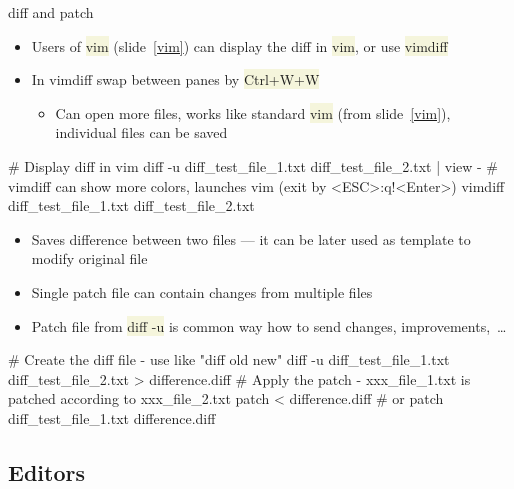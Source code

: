 \documentclass[compress, xelatex, 11pt, xcolor=svgnames, aspectratio=169,
	hyperref={
		bookmarks=true,
		unicode=true,
		colorlinks=true,
		pdftitle={Linux, command line and MetaCentrum},
		plainpages=false,
		pdfauthor={Vojtech Zeisek},
		pdfsubject={Course about use of Linux command line, writing shell scripts and using MetaCentrum of CESNET},
		pdfcreator={XeLaTeX},
		pdfkeywords={Linux, GNU, BASH, shell, command line, MetaCentrum},
		linkcolor=DarkRed, %
		anchorcolor=DarkBlue, %
		citecolor=Indigo, %
		filecolor=NavyBlue, %
		menucolor=DarkMagenta, %
		urlcolor=DarkBlue, %
		},
	url={hyphens, lowtilde} %
	]{beamer}
\renewcommand{\texttt}[1]{\colorbox{Beige}{{\ttfamily #1}}}
\begin{document}
\begin{frame}[fragile]{diff and patch}
	\begin{itemize}
		\item Users of \texttt{vim} (slide~\ref{vim}) can display the diff in \texttt{vim}, or use \texttt{vimdiff}
		\item In vimdiff swap between panes by \texttt{Ctrl+W+W}
		\begin{itemize}
			\item Can open more files, works like standard \texttt{vim} (from slide~\ref{vim}), individual files can be saved
		\end{itemize}
	\end{itemize}
	\vfill
	\begin{bashcode}
    # Display diff in vim
    diff -u diff_test_file_1.txt diff_test_file_2.txt | view -
    # vimdiff can show more colors, launches vim (exit by <ESC>:q!<Enter>)
    vimdiff diff_test_file_1.txt diff_test_file_2.txt
	\end{bashcode}
	\vfill
	\begin{itemize}
		\item Saves difference between two files --- it can be later used as template to modify original file
		\item Single patch file can contain changes from multiple files
		\item Patch file from \texttt{diff -u} is common way how to send changes, improvements,~\ldots
	\end{itemize}
	\vfill
	\begin{bashcode}
    # Create the diff file - use like "diff old new"
    diff -u diff_test_file_1.txt diff_test_file_2.txt > difference.diff
    # Apply the patch - xxx_file_1.txt is patched according to xxx_file_2.txt
    patch < difference.diff # or
    patch diff_test_file_1.txt difference.diff
	\end{bashcode}
\end{frame}

\subsection{Editors}
\end{document}
